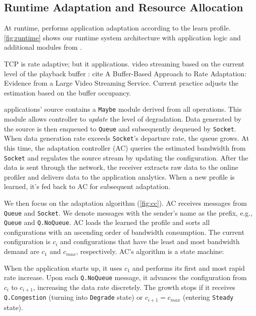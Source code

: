 \subsection{Runtime Adaptation and Resource Allocation}
\label{sec:runtime}

At runtime, \sysname{} performs application adaptation according to the learn
profile. \autoref{fig:runtime} shows our runtime system architecture with
application logic and additional modules from \sysname{}.

 TCP is rate adaptive; but it applications.  video
streaming based on the current level of the playback buffer : cite A
Buffer-Based Approach to Rate Adaptation: Evidence from a Large Video Streaming
Service. Current practice adjusts the estimation based on the buffer occupancy.

\sysname{} applications' source contains a \texttt{Maybe} module derived from
all \maybe{} operations. This module allows controller to \textit{update} the
level of degradation. Data generated by the source is then enqueued to
\texttt{Queue} and subsequently dequeued by \texttt{Socket}. When data
generation rate exceeds \texttt{Socket}'s departure rate, the queue grows. At
this time, the adaptation controller (AC) queries the estimated bandwidth from
\texttt{Socket} and regulates the source stream by updating the configuration.
After the data is sent through the network, the receiver extracts raw data to
the online profiler and delivers data to the application analytics.
 When a new profile is learned, it's
fed back to AC for subsequent adaptation.

We then focus on the adaptation algorithm (\autoref{fig:cc}). AC receives
messages from \texttt{Queue} and \texttt{Socket}. We denote messages with the
sender's name as the prefix, e.g., \texttt{Queue} and \texttt{Q.NoQueue}. AC
loads the learned the profile and sorts all configurations with an ascending
order of bandwidth consumption. The current configuration is $c_i$ and
configurations that have the least and most bandwidth demand are $c_1$ and
$c_{max}$, respectively. AC's algorithm is a state machine:

 When the application starts up, it uses $c_1$ and
performs its first and most rapid rate increase. Upon each \texttt{Q.NoQueue}
message, it advances the configuration from $c_i$ to $c_{i+1}$, increasing the
data rate discretely. The growth stops if it receives \texttt{Q.Congestion}
(turning into \texttt{Degrade} state) or $c_{i+1} = c_{max}$ (entering
\texttt{Steady} state).

